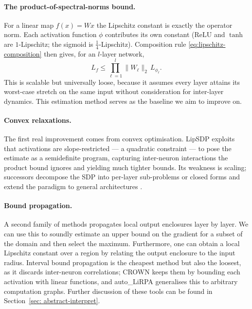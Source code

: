 \paragraph{The product-of-spectral-norms bound.} For a linear map $f(x)=Wx$ the Lipschitz constant is exactly the operator norm. Each activation function $\phi$ contributes its own constant ($\mathrm{ReLU}$ and $\tanh$ are $1$-Lipschitz; the sigmoid is $\tfrac14$-Lipschitz). Composition rule \eqref{eq:lipschitz-composition} then gives, for an $l$-layer network,
\begin{equation}
\label{eq:lipschitz-layer}
    L_f \le \prod_{\ell=1}^{l}\|W_\ell\|_2\,L_{\phi_\ell}.
\end{equation}
This is scalable but universally loose, because it assumes every layer attains its worst-case stretch on the same input without consideration for inter-layer dynamics. This estimation method serves as the baseline we aim to improve on.

\paragraph{Convex relaxations.} The first real improvement comes from convex optimisation. LipSDP \cite{fazlyab2019lipsdp} exploits that activations are slope-restricted --- a quadratic constraint --- to pose the estimate as a semidefinite program, capturing inter-neuron interactions the product bound ignores and yielding much tighter bounds. Its weakness is scaling; successors decompose the SDP into per-layer sub-problems or closed forms \cite{xu2024eclipse} and extend the paradigm to general architectures \cite{pauli2024controltools}.

\paragraph{Bound propagation.} A second family of methods propagates local output enclosures layer by layer. We can use this to soundly estimate an upper bound on the gradient for a subset of the domain and then select the maximum. Furthermore, one can obtain a local Lipschitz constant over a region by relating the output enclosure to the input radius. Interval bound propagation \cite{gowal2018ibp} is the cheapest method but also the loosest, as it discards inter-neuron correlations; CROWN \cite{zhang2018crown} keeps them by bounding each activation with linear functions, and auto\_LiRPA \cite{xu2020autolirpa} generalises this to arbitrary computation graphs. Further discussion of these tools can be found in Section~\ref{sec: abstract-interpret}.

